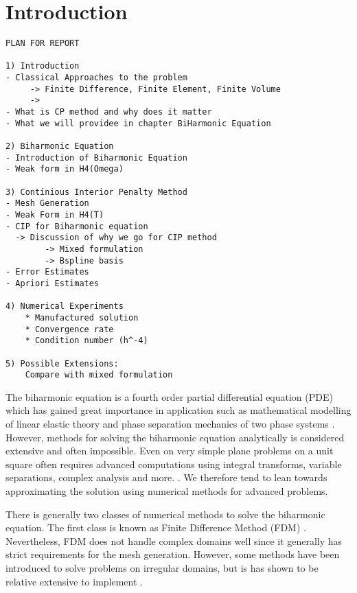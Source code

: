 \section{Introduction}\label{sec:introduction}



\begin{verbatim}
PLAN FOR REPORT

1) Introduction
- Classical Approaches to the problem
     -> Finite Difference, Finite Element, Finite Volume
     ->
- What is CP method and why does it matter
- What we will providee in chapter BiHarmonic Equation

2) Biharmonic Equation
- Introduction of Biharmonic Equation
- Weak form in H4(Omega)

3) Continious Interior Penalty Method
- Mesh Generation
- Weak Form in H4(T)
- CIP for Biharmonic equation
  -> Discussion of why we go for CIP method
        -> Mixed formulation
        -> Bspline basis
- Error Estimates
- Apriori Estimates

4) Numerical Experiments
    * Manufactured solution
    * Convergence rate
    * Condition number (h^-4)

5) Possible Extensions:
    Compare with mixed formulation

\end{verbatim}


The biharmonic equation is a fourth order partial differential equation (PDE) which has gained great importance in
application such as mathematical modelling of linear elastic theory \cite{selvadurai13} and phase separation mechanics
of two phase systems \cite{cahnhilliard1957, kim16}. However, methods for solving the biharmonic equation analytically
is considered extensive and often impossible. Even on very simple plane problems on a unit square often requires advanced computations using integral transforms, variable separations, complex analysis and more. \cite{selvadurai13}. We therefore tend
to lean towards approximating the solution using numerical methods for advanced problems.

There is generally two classes of numerical methods to solve the biharmonic equation. The first class is known as Finite Difference Method (FDM) \cite{ehrlich75, hackbusch17}. Nevertheless, FDM does not handle complex domains well since it generally
has strict requirements for the mesh generation. However, some methods have been introduced to solve problems on irregular domains, but is has shown to be relative extensive to implement \cite{hackbusch17, chen08, belyaev18}.


